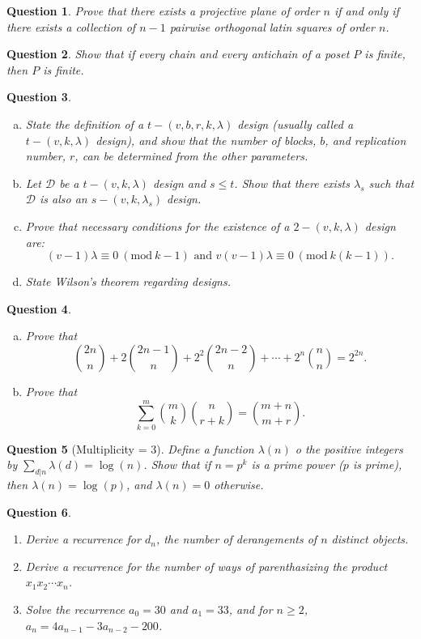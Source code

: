 \documentclass[12]{article}
\newcommand{\Mod}[1]{\ (\mathrm{mod}\ #1)}
\newtheorem{question}{Question}
\theoremstyle{definition}
\begin{document}
	\begin{question}
		Prove that there exists a projective plane of order $n$ if and only if there exists a collection of $n-1$ pairwise orthogonal latin squares of order $n$.
	\end{question}

	\begin{question}
		Show that if every chain and every antichain of a poset $P$ is finite, then $P$ is finite.
	\end{question}

	\begin{question}
		\
		\begin{enumerate}[a)]
			\item State the definition of a $t-(v,b,r,k,\lambda)$ design (usually called a $t-(v,k,\lambda)$ design), and show that the number of blocks, $b$, and replication number, $r$, can be determined from the other parameters.
			\item Let $\mathcal{D}$ be a $t-(v,k,\lambda)$ design and $s \leq t$.  Show that there exists $\lambda_s$ such that $\mathcal{D}$ is also an $s-(v,k,\lambda_s)$ design.
			\item Prove that necessary conditions for the existence of a $2-(v,k,\lambda)$ design are:
			$$(v-1)\lambda \equiv 0 \Mod{k-1} \text{ and } v(v-1)\lambda \equiv 0 \Mod{k(k-1)}.$$
			\item State Wilson's theorem regarding designs.
		\end{enumerate}
	\end{question}

	\begin{question}
		\
		\begin{enumerate}[a)]
			\item Prove that
			$$ {2n \choose n} + 2{2n-1 \choose n} + 2^2{2n - 2 \choose n} + \cdots + 2^n{n \choose n} = 2^{2n}.$$
			\item Prove that
			$$ \sum_{k=0}^m {m \choose k} {n \choose r+k} = {m + n \choose m+r}.$$
		\end{enumerate}
	\end{question}
	
	\begin{question}[Multiplicity = 3]
		Define a function $\lambda(n)$ o the positive integers by $\sum_{d|n} \lambda(d) = \log(n)$.  Show that if $n =  p^k$ is a prime power ($p$ is prime), then $\lambda(n) = \log(p)$, and $\lambda(n) = 0$ otherwise.
	\end{question}
	
	\begin{question}
		\
		\begin{enumerate}
			\item Derive a recurrence for $d_n$, the number of derangements of $n$ distinct objects.
			\item Derive a recurrence for the number of ways of parenthasizing the product $x_1x_2\cdots x_n$.
			\item Solve the recurrence $a_0 = 30$ and $a_1 = 33$, and for $n \geq 2$, $a_n = 4a_{n-1} - 3a_{n-2}-200$.
		\end{enumerate}
	\end{question}
	
\end{document}
